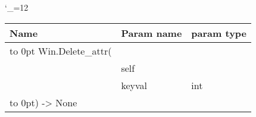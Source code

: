 \begingroup \catcode`\_=12 \tt
\begin{tabular}{lll}
\toprule
\textrm{Name}&\textrm{Param name}&\textrm{param type}\\
\midrule
\hbox to 0pt {Win.Delete_attr(\hss}\\
& self\\
& keyval & int\\
\hbox to 0pt{) -> None\hss}\\
\bottomrule
\end{tabular}
\endgroup
